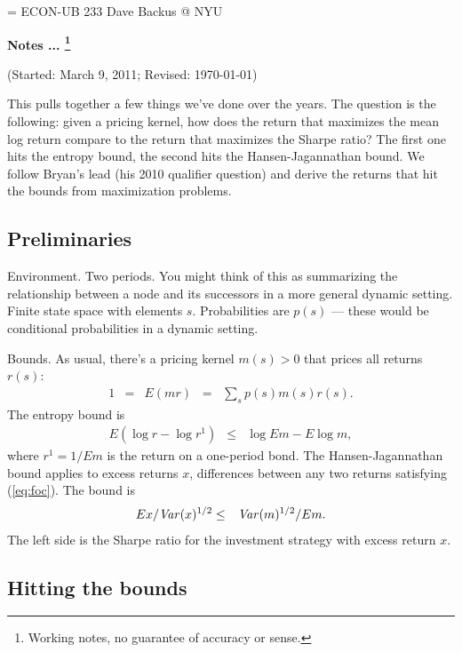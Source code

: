 \documentclass[11pt]{article}
\newcommand{\var}{\mbox{\it Var\/}}
\begin{document}
\parskip=\bigskipamount
\parindent=0.0in
\thispagestyle{empty}
{\large ECON-UB 233 \hfill Dave Backus @ NYU} 

\bigskip\bigskip
\centerline{\Large \bf Notes ... %
\footnote{Working notes, no guarantee of accuracy or sense.}}
\centerline{(Started: March 9, 2011; Revised: \today)}

\bigskip
This pulls together a few things we've done over the years.
The question is the following:  given a pricing kernel,
how does the return that maximizes the mean log return
compare to the return that maximizes the Sharpe ratio?
The first one hits the entropy bound,
the second hits the Hansen-Jagannathan bound.
We follow Bryan's lead (his 2010 qualifier question)
and derive the returns that hit the bounds
from maximization problems.


\subsection*{Preliminaries}

Environment.  Two periods.
You might think of this as summarizing the relationship between
a node and its successors in a more general dynamic setting.
Finite state space with elements $s$.
Probabilities are $p(s)$ --- these would be conditional probabilities
in a dynamic setting.

Bounds.  As usual, there's a pricing kernel $m(s)>0$
that prices all returns $r(s)$:
\begin{eqnarray}
    1 &=& E ( m r )
            \;\;=\;\; \sum_s p(s) m(s) r(s) .
            \label{eq:foc}
\end{eqnarray}
The entropy bound is
\begin{eqnarray}
    E ( \log r - \log r^1 )
            &\leq& \log E m - E \log m ,
            \label{eq:bound-entropy}
\end{eqnarray}
where $r^1 = 1/E m $ is the return on a one-period bond.
The Hansen-Jagannathan bound applies to
excess returns $x$,  differences between any two returns
satisfying (\ref{eq:foc}).
The bound is
\begin{eqnarray}
    E x /\var (x)^{1/2}
            &\leq& \var (m)^{1/2} /E m .
            \label{eq:bound-hj}
\end{eqnarray}
The left side is the Sharpe ratio for the investment strategy with
excess return $x$.


\subsection*{Hitting the bounds}
\end{document}
